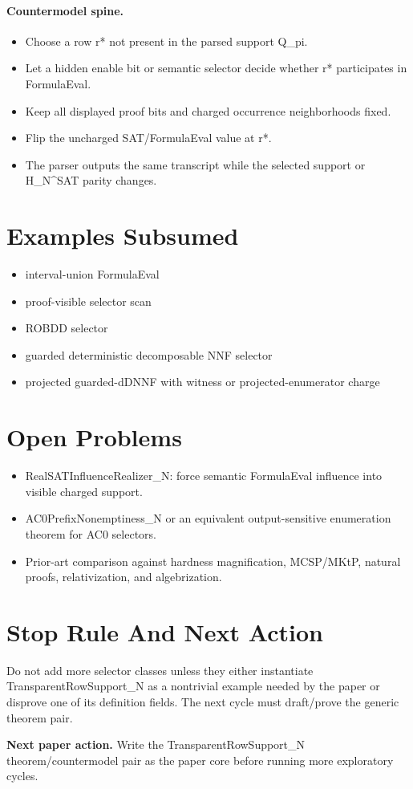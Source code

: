 \documentclass[11pt]{article}
\begin{document}
\paragraph{Countermodel spine.}
\begin{itemize}
\item Choose a row r* not present in the parsed support Q\_pi.
\item Let a hidden enable bit or semantic selector decide whether r* participates in FormulaEval.
\item Keep all displayed proof bits and charged occurrence neighborhoods fixed.
\item Flip the uncharged SAT/FormulaEval value at r*.
\item The parser outputs the same transcript while the selected support or H\_N\textasciicircum{}SAT parity changes.
\end{itemize}

\section{Examples Subsumed}
\begin{itemize}
\item interval-union FormulaEval
\item proof-visible selector scan
\item ROBDD selector
\item guarded deterministic decomposable NNF selector
\item projected guarded-dDNNF with witness or projected-enumerator charge
\end{itemize}

\section{Open Problems}
\begin{itemize}
\item RealSATInfluenceRealizer\_N: force semantic FormulaEval influence into visible charged support.
\item AC0PrefixNonemptiness\_N or an equivalent output-sensitive enumeration theorem for AC0 selectors.
\item Prior-art comparison against hardness magnification, MCSP/MKtP, natural proofs, relativization, and algebrization.
\end{itemize}

\section{Stop Rule And Next Action}
Do not add more selector classes unless they either instantiate TransparentRowSupport\_N as a nontrivial example needed by the paper or disprove one of its definition fields. The next cycle must draft/prove the generic theorem pair.

\medskip
\noindent\textbf{Next paper action.} Write the TransparentRowSupport\_N theorem/countermodel pair as the paper core before running more exploratory cycles.
\end{document}
